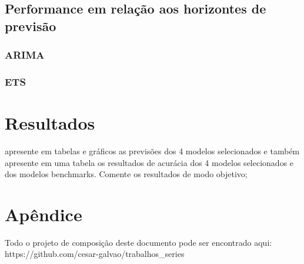 \documentclass[
  letterpaper,
  DIV=11,
  numbers=noendperiod]{scrartcl}
\begin{document}
\hypertarget{performance-em-relauxe7uxe3o-aos-horizontes-de-previsuxe3o}{%
\subsection{Performance em relação aos horizontes de
previsão}\label{performance-em-relauxe7uxe3o-aos-horizontes-de-previsuxe3o}}

\hypertarget{arima}{%
\subsubsection{ARIMA}\label{arima}}

\hypertarget{ets}{%
\subsubsection{ETS}\label{ets}}

\hypertarget{resultados}{%
\section{Resultados}\label{resultados}}

apresente em tabelas e gráficos as previsões dos 4 modelos selecionados
e também apresente em uma tabela os resultados de acurácia dos 4 modelos
selecionados e dos modelos benchmarks. Comente os resultados de modo
objetivo;

\hypertarget{apuxeandice}{%
\section{Apêndice}\label{apuxeandice}}

Todo o projeto de composição deste documento pode ser encontrado aqui:
https://github.com/cesar-galvao/trabalhos\_series
\end{document}
